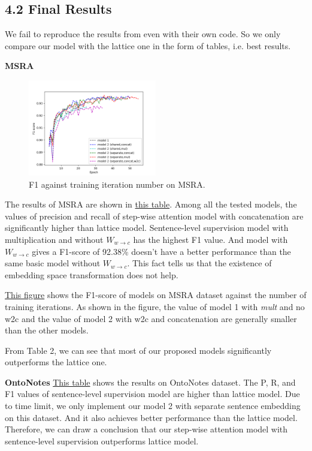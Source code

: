 \documentclass[letterpaper]{article} %
\begin{document}
\subsection{4.2 Final Results}
We fail to reproduce the results from \cite{lattice} even with their own code. So we only compare our model with the lattice one in the form of tables, i.e. best results.


\textbf{MSRA} 

\begin{figure}
\label{fig:msra}
\centering
\includegraphics[width=0.5\textwidth]{MSRA.PNG}
\caption{F1 against training iteration number on MSRA.}
\end{figure}

The results of MSRA are shown in \hyperref[tab:msra]{this table}. Among all the tested models, the values of precision and recall of step-wise attention model with concatenation are significantly higher than lattice model. Sentence-level supervision model with multiplication and without $W_{w\rightarrow c}$ has the highest F1 value. And model with $W_{w\rightarrow c}$ gives a F1-score of 92.38\% doesn't have a better performance than the same basic model without $W_{w\rightarrow c}$. This fact tells us that the existence of embedding space transformation does not help.

\hyperref[fig:msra]{This figure} shows the F1-score of models on MSRA dataset against the number of training iterations. As shown in the figure, the value of model 1 with \textit{mult} and no w2c and the value of model 2 with w2c and concatenation are generally smaller than the other models.

From \hypertarget{tab:msra}{Table 2}, we can see that most of our proposed models significantly outperforms the lattice one.

\textbf{OntoNotes} \hyperref[tab:onto]{This table} shows the results on OntoNotes dataset. The P, R, and F1 values of sentence-level supervision model are higher than lattice model. Due to time limit, we only implement our model 2 with separate sentence embedding on this dataset. And it also achieves better performance than the lattice model. Therefore, we can draw a conclusion that our step-wise attention model with sentence-level supervision outperforms lattice model. 
\end{document}
